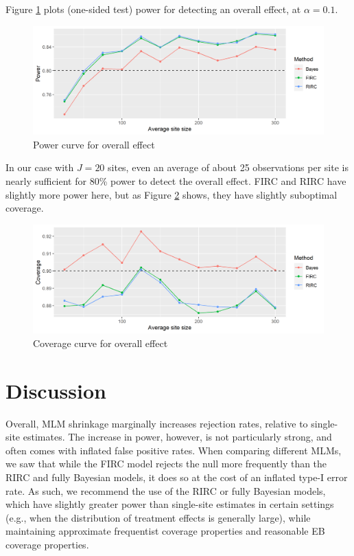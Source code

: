 \documentclass[]{article}
\begin{document}
Figure \ref{fig:power_plot_overall} plots (one-sided test) power for detecting an overall effect, at $\alpha = 0.1$.
\begin{figure}[ht]
	\centering
	\includegraphics[width=\textwidth]{power_plot_overall}
	\caption{Power curve for overall effect}
	\label{fig:power_plot_overall}
\end{figure}
In our case with $J=20$ sites, even an average of about 25 observations per site is nearly sufficient for 80\% power to detect the overall effect.
FIRC and RIRC have slightly more power here, but as Figure \ref{fig:coverage_plot_overall} shows, they have slightly suboptimal coverage.
\begin{figure}[ht]
	\centering
	\includegraphics[width=\textwidth]{coverage_plot_overall}
	\caption{Coverage curve for overall effect}
	\label{fig:coverage_plot_overall}
\end{figure}

\section{Discussion}
Overall, MLM shrinkage marginally increases rejection rates, relative to single-site estimates.
The increase in power, however, is not particularly strong, and often comes with inflated false positive rates.
When comparing different MLMs, we saw that while the FIRC model rejects the null more frequently than the RIRC and fully Bayesian models, it does so at the cost of an inflated type-I error rate.
As such, we recommend the use of the RIRC or fully Bayesian models, which have slightly greater power than single-site estimates in certain settings (e.g., when the distribution of treatment effects is generally large), while maintaining approximate frequentist coverage properties and reasonable EB coverage properties.
\end{document}
